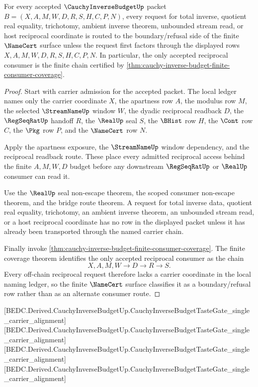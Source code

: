 \begin{theorem}
\label{thm:cauchy-inverse-budget-terminal-refusal-classifier}
For every accepted $\CauchyInverseBudgetUp$ packet $B=(X,A,M,W,D,R,S,H,C,P,N)$, every request for total inverse, quotient real equality, trichotomy, ambient inverse theorem, unbounded stream read, or host reciprocal coordinate is routed to the boundary/refusal side of the finite $\NameCert$ surface unless the request first factors through the displayed rows $X,A,M,W,D,R,S,H,C,P,N$. In particular, the only accepted reciprocal consumer is the finite chain certified by \autoref{thm:cauchy-inverse-budget-finite-consumer-coverage}.
\end{theorem}
\begin{proof}
Start with carrier admission for the accepted packet. The local ledger names only the carrier coordinate $X$, the apartness row $A$, the modulus row $M$, the selected $\StreamNameUp$ window $W$, the dyadic reciprocal readback $D$, the $\RegSeqRatUp$ handoff $R$, the $\RealUp$ seal $S$, the $\BHist$ row $H$, the $\Cont$ row $C$, the $\Pkg$ row $P$, and the $\NameCert$ row $N$.

Apply the apartness exposure, the $\StreamNameUp$ window dependency, and the reciprocal readback route. These place every admitted reciprocal access behind the finite $A,M,W,D$ budget before any downstream $\RegSeqRatUp$ or $\RealUp$ consumer can read it.

Use the $\RealUp$ seal non-escape theorem, the scoped consumer non-escape theorem, and the bridge route theorem. A request for total inverse data, quotient real equality, trichotomy, an ambient inverse theorem, an unbounded stream read, or a host reciprocal coordinate has no row in the displayed packet unless it has already been transported through the named carrier chain.

Finally invoke \autoref{thm:cauchy-inverse-budget-finite-consumer-coverage}. The finite coverage theorem identifies the only accepted reciprocal consumer as the chain
$$
X,A,M,W \longrightarrow D \longrightarrow R \longrightarrow S.
$$
Every off-chain reciprocal request therefore lacks a carrier coordinate in the local naming ledger, so the finite $\NameCert$ surface classifies it as a boundary/refusal row rather than as an alternate consumer route.
\end{proof}

[BEDC.Derived.CauchyInverseBudgetUp.CauchyInverseBudgetTasteGate\_single\_carrier\_alignment]
[BEDC.Derived.CauchyInverseBudgetUp.CauchyInverseBudgetTasteGate\_single\_carrier\_alignment]
[BEDC.Derived.CauchyInverseBudgetUp.CauchyInverseBudgetTasteGate\_single\_carrier\_alignment]
[BEDC.Derived.CauchyInverseBudgetUp.CauchyInverseBudgetTasteGate\_single\_carrier\_alignment]

